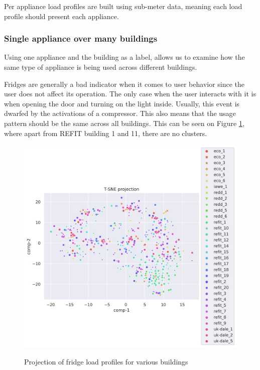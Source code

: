 Per appliance load profiles are built using sub-meter data,
meaning each load profile should present each appliance.

\subsubsection{Single appliance over many buildings}

Using one appliance and the building as a label,
allows us to examine how the same type of appliance is being used across different buildings.

Fridges are generally a bad indicator when it comes to user behavior since the user does not affect its operation. 
The only case when the user interacts with it is when opening the door and turning on the light inside. 
Usually, this event is dwarfed by the activations of a compressor. 
This also means that the usage pattern should be the same across all buildings. 
This can be seen on Figure \ref{fig:tsne_pa_scatter_all_fridge}, 
where apart from REFIT building 1 and 11, there are no clusters.


\begin{figure}[H]
	\centering
	\caption{Projection of fridge load profiles for various buildings}
	\includegraphics[width=1.2\textwidth]{Figures/TSNE/TSNE_per_appliance/all/scatter_all_fridge_freeezer_fridge freezer.png}
	\label{fig:tsne_pa_scatter_all_fridge}
\end{figure}

